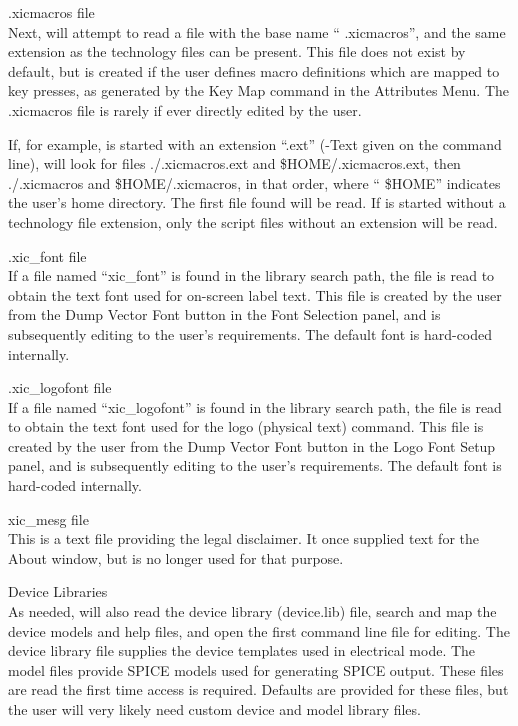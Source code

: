 \begin{description}
\item{{\vt .xicmacros} file}\\
Next, {\Xic} will attempt to read a file with the base name ``{\vt
.xicmacros}'', and the same extension as the technology files can be
present.  This file does not exist by default, but is created if the
user defines macro definitions which are mapped to key presses, as
generated by the {\cb Key Map} command in the {\cb Attributes Menu}. 
The {\vt .xicmacros} file is rarely if ever directly edited by the
user.

If, for example, {\Xic} is started with an extension ``{\vt .ext}''
({\et -Text} given on the command line), {\Xic} will look for files
{\vt ./.xicmacros.ext} and {\vt \$HOME/.xicmacros.ext}, then {\vt
./.xicmacros} and {\vt \$HOME/.xicmacros}, in that order, where ``{\vt
\$HOME}'' indicates the user's home directory.  The first file found
will be read.  If {\Xic} is started without a technology file
extension, only the script files without an extension will be read. 

\item{{\vt .xic\_font} file}\\
If a file named ``xic\_font'' is found in the library search path, the
file is read to obtain the text font used for on-screen label text. 
This file is created by the user from the {\cb Dump Vector Font}
button in the {\cb Font Selection} panel, and is subsequently editing
to the user's requirements.  The default font is hard-coded
internally.

\item{{\vt .xic\_logofont} file}\\
If a file named ``xic\_logofont'' is found in the library search path,
the file is read to obtain the text font used for the {\cb logo}
(physical text) command.  This file is created by the user from the
{\cb Dump Vector Font} button in the {\cb Logo Font Setup} panel, and
is subsequently editing to the user's requirements.  The default font
is hard-coded internally.

\item{{\vt xic\_mesg} file}\\
This is a text file providing the legal disclaimer.  It once supplied
text for the {\cb About} window, but is no longer used for that
purpose.

\item{Device Libraries}\\
As needed, {\Xic} will also read the device library ({\vt device.lib})
file, search and map the device models and help files, and open the
first command line file for editing.  The device library file supplies
the device templates used in electrical mode.  The model files provide
SPICE models used for generating SPICE output.  These files are read
the first time access is required.  Defaults are provided for these
files, but the user will very likely need custom device and model
library files.
\end{description}


